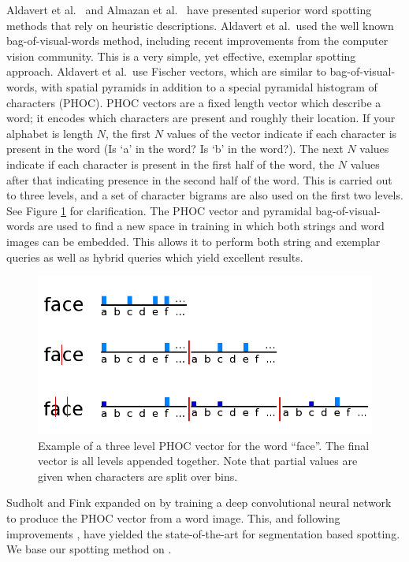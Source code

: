 \documentclass[ms,electronic,twosidetoc,letterpaper,chaptercenter,parttop,lol,lof,lot]{byumsphd}
\begin{document}
Aldavert et al.~\cite{Aldavert2015} and Almazan et al.~\cite{Almazan2014} have presented superior word spotting methods that rely on heuristic descriptions. Aldavert et al.~used the well known bag-of-visual-words method, including recent improvements from the computer vision community. This is a very simple, yet effective, exemplar spotting approach. Aldavert et al.~use Fischer vectors, which are similar to bag-of-visual-words, with spatial pyramids in addition to a special pyramidal histogram of characters (PHOC).
PHOC vectors are a fixed length vector which describe a word; it encodes which characters are present and roughly their location. If your alphabet is length $N$, the first $N$ values of the vector indicate if each character is present in the word (Is `a' in the word? Is `b' in the word?). The next $N$ values indicate if each character is present in the first half of the word, the $N$ values after that indicating presence in the second half of the word. This is carried out to three levels, and a set of character bigrams are also used on the first two levels. See Figure \ref{fig:phoc} for clarification.
The PHOC vector and pyramidal bag-of-visual-words are used to find a new space in training in which both strings and word images can be embedded. This allows it to perform both string and exemplar queries as well as hybrid queries which yield excellent results.

\begin{figure}[t]
    \centering
    \includegraphics[width=.65\textwidth]{phoc}
    \caption{Example of a three level PHOC vector for the word ``face''. The final vector is all levels appended together. Note that partial values are given when characters are split over bins.}
    \label{fig:phoc}
\end{figure}

Sudholt and Fink \cite{sudholt2016} expanded on \cite{Almazan2014} by training a deep convolutional neural network to produce the PHOC vector from a word image. This, and following improvements \cite{krishnan2016, retsinasTrans2017}, have yielded the state-of-the-art for segmentation based spotting. We base our spotting method on \cite{sudholt2016}.
\end{document}
